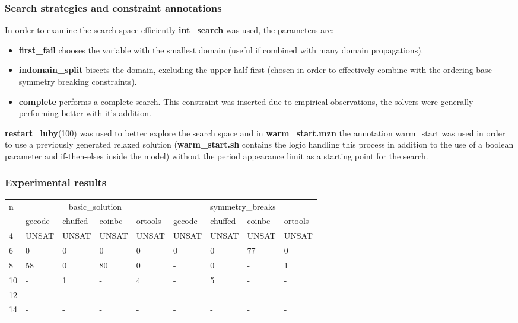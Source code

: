 \documentclass{article}
\begin{document}
\subsubsection{Search strategies and constraint annotations}
In order to examine the search space efficiently \textbf{int\_search} was used, the parameters are:
\begin{itemize}
    \item \textbf{first\_fail} chooses the variable with the smallest
    domain (useful if combined with many domain propagations).
    \item \textbf{indomain\_split} bisects the domain, excluding the upper half first (chosen in order to effectively combine with the ordering base symmetry breaking constraints).
    \item \textbf{complete} performs a complete search. This constraint was inserted due to empirical observations, the solvers were generally performing better with it's addition.
\end{itemize}
\textbf{restart\_luby}(100) was used to better explore the search space and
in \textbf{warm\_start.mzn} the annotation warm\_start was used in order to use a previously generated relaxed solution (\textbf{warm\_start.sh} contains the logic handling this process in addition to the use of a boolean parameter and if-then-elses inside the model) without the period appearance limit as a starting point for the search.

\subsubsection{Experimental results}

\begin{table}[H]
\centering
{\small
\begin{tabular}{ |p{0.35cm}|p{1.21cm}|p{1.21cm}|p{1.21cm}|p{1.21cm}||p{1.21cm}|p{1.21cm}|p{1.21cm}|p{1.21cm}|}
 \hline
 \multirow{2}{*}{n} & \multicolumn{4}{|c|}{basic\_solution}& \multicolumn{4}{|c|}{symmetry\_breaks}\\
 \cline{2-9}
  &  gecode& chuffed & coinbc & ortools & gecode& chuffed & coinbc & ortools \\
 \hline
 4&  UNSAT& UNSAT& UNSAT&   UNSAT&  UNSAT& UNSAT& UNSAT&    UNSAT\\
 6&   0& 0&  0&  0&  0& 0& 77&        0\\
 8&   58&  0& 80&   0&  -& 0& -&      1\\
 10&  -& 1&  -&   4&  -& 5& -&   -\\
 12&  -&  -&  -& -&  -& -& -&      -\\
 14&  -&  -& -&  -&  -& -& -&    -\\

\end{tabular}}

\end{table}
\end{document}
